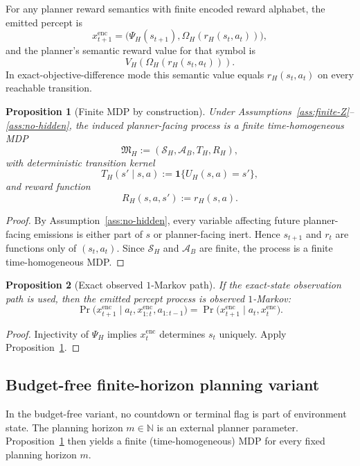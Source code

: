 \documentclass[11pt]{article}
\newtheorem{proposition}{Proposition}
\begin{document}
For any planner reward semantics with finite encoded reward alphabet, the emitted percept is
\[
x_{t+1}^{\mathrm{enc}}=
\bigl(\Psi_H(s_{t+1}),\Omega_H(r_H(s_t,a_t))\bigr),
\]
and the planner's semantic reward value for that symbol is
\[
V_H(\Omega_H(r_H(s_t,a_t))).
\]
In exact-objective-difference mode this semantic value equals
$r_H(s_t,a_t)$ on every reachable transition.

\begin{proposition}[Finite MDP by construction]\label{prop:finite-mdp}
Under Assumptions~\ref{ass:finite-Z}--\ref{ass:no-hidden}, the induced
planner-facing process is a finite time-homogeneous MDP
\[
\mathfrak{M}_H:=(\mathcal{S}_H,\mathcal{A}_B,T_H,R_H),
\]
with deterministic transition kernel
\[
T_H(s'\mid s,a):=\mathbf{1}\{U_H(s,a)=s'\},
\]
and reward function
\[
R_H(s,a,s'):=r_H(s,a).
\]
\end{proposition}

\begin{proof}
By Assumption~\ref{ass:no-hidden}, every variable affecting future
planner-facing emissions is either part of $s$ or planner-facing inert. Hence
$s_{t+1}$ and $r_t$ are functions only of $(s_t,a_t)$. Since
$\mathcal{S}_H$ and $\mathcal{A}_B$ are finite, the process is a finite
time-homogeneous MDP.
\end{proof}

\begin{proposition}[Exact observed $1$-Markov path]\label{prop:obs-1-markov}
If the exact-state observation path is used, then the emitted percept process is
observed $1$-Markov:
\[
\Pr\!\bigl(x_{t+1}^{\mathrm{enc}}\mid a_t,x_{1:t}^{\mathrm{enc}},a_{1:t-1}\bigr)
=
\Pr\!\bigl(x_{t+1}^{\mathrm{enc}}\mid a_t,x_t^{\mathrm{enc}}\bigr).
\]
\end{proposition}

\begin{proof}
Injectivity of $\Psi_H$ implies $x_t^{\mathrm{enc}}$ determines $s_t$
uniquely. Apply Proposition~\ref{prop:finite-mdp}.
\end{proof}

\subsection{Budget-free finite-horizon planning variant}

In the budget-free variant, no countdown or terminal flag is part of
environment state. The planning horizon $m\in\mathbb{N}$ is an external planner
parameter. Proposition~\ref{prop:finite-mdp} then yields a finite
(time-homogeneous) MDP for every fixed planning horizon $m$.
\end{document}
